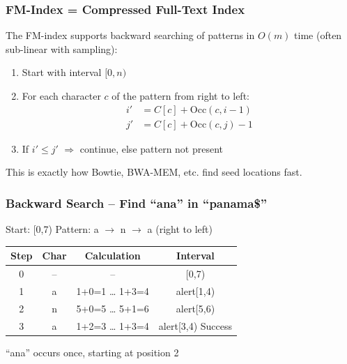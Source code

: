 \documentclass[
11pt, %
aspectratio=169, %
]{beamer}
\begin{document}
\begin{frame}
	\frametitle{FM-Index = Compressed Full-Text Index}
	
	The FM-index supports \alert{backward searching} of patterns in $O(m)$ time (often sub-linear with sampling):
	
	\begin{enumerate}
		\item Start with interval $[0, n)$
		\item For each character $c$ of the pattern \alert{from right to left}:
		\[
		\begin{aligned}
			i' &= C[c] + \text{Occ}(c, i-1) \\
			j' &= C[c] + \text{Occ}(c, j) - 1
		\end{aligned}
		\]
		\item If $i' \le j'$ $\Rightarrow$ continue, else pattern not present
	\end{enumerate}
	
	\bigskip
	This is exactly how Bowtie, BWA-MEM, etc. find seed locations fast.
\end{frame}


\begin{frame}
\frametitle{Backward Search – Find ``ana'' in ``panama\$''}
Start: [0,7) \quad Pattern: a $\to$ n $\to$ a (right to left)

\bigskip
\centering
\small
\begin{tabular}{c|c|c|c}
Step & Char & Calculation                    & Interval     \\ \hline
0    & –    & –                              & [0,7)         \\ \hline
1    & a    & 1+0=1 … 1+3=4                 & alert{[1,4)}  \\
2    & n    & 5+0=5 … 5+1=6                 & alert{[5,6)}  \\
3    & a    & 1+2=3 … 1+3=4                 & alert{[3,4)} Success \\
\end{tabular}
\normalsize

\bigskip
\alert{``ana'' occurs once, starting at position 2}
\end{frame}

\end{document}

